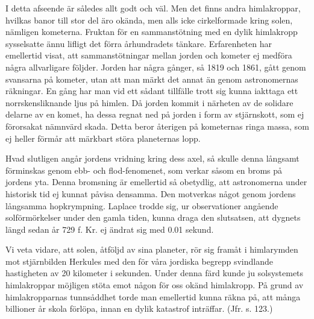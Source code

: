 \documentclass[a4paper, 12pt, oneside, swedish]{article}
\begin{document}
I detta afseende är således allt godt och väl. Men det finns andra himlakroppar, hvilkas banor till stor del äro okända, men alls icke cirkelformade kring solen, nämligen kometerna. Fruktan för en sammanstötning med en dylik himlakropp sysselsatte ännu lifligt det förra århundradets tänkare. Erfarenheten har emellertid visat, att sammanstötningar mellan jorden och kometer ej medföra några allvarligare följder. Jorden har några gånger, så 1819 och 1861, gått genom svansarna på kometer, utan att man märkt det annat än genom astronomernas räkningar. En gång har man vid ett sådant tillfälle trott sig kunna iakttaga ett norrskensliknande ljus på himlen. Då jorden kommit i närheten av de solidare delarne av en komet, ha dessa regnat ned på jorden i form av stjärnskott, som ej förorsakat nämnvärd skada. Detta beror återigen på kometernas ringa massa, som ej heller förmår att märkbart störa planeternas lopp.

Hvad slutligen angår jordens vridning kring dess axel, så skulle denna långsamt förminskas genom ebb- och flod-fenomenet, som verkar såsom en broms på jordens yta. Denna bromsning är emellertid så obetydlig, att astronomerna under historisk tid ej kunnat påvisa densamma. Den motverkas något genom jordens långsamma hopkrympning. Laplace trodde sig, ur observationer angående solförmörkelser under den gamla tiden, kunna draga den slutsatsen, att dygnets längd sedan år 729 f. Kr. ej ändrat sig med 0.01 sekund.

Vi veta vidare, att solen, åtföljd av sina planeter, rör sig framåt i himlarymden mot stjärnbilden Herkules med den för våra jordiska begrepp svindlande hastigheten av 20 kilometer i sekunden. Under denna färd kunde ju solsystemets himlakroppar möjligen stöta emot någon för oss okänd himlakropp. På grund av himlakropparnas tunnsåddhet torde man emellertid kunna räkna på, att många billioner år skola förlöpa, innan en dylik katastrof inträffar. (Jfr. s. 123.)
\end{document}

